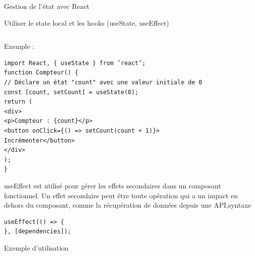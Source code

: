 \documentclass[5pt]{beamer}
\begin{document}
{\begin{frame}[fragile]{ Gestion de l’état avec React}
\begin{block} {Utiliser le state local et les hooks (useState, useEffect)}
\begin{verbatim}
\end{verbatim}
\end{block}
\end{frame}

\begin{frame}[fragile]{ }
\begin{block} {}
Exemple :

\begin{verbatim}
import React, { useState } from ’react’;
function Compteur() {
// Déclare un état "count" avec une valeur initiale de 0
const [count, setCount] = useState(0);
return (
<div>
<p>Compteur : {count}</p>
<button onClick={() => setCount(count + 1)}>
Incrémenter</button>
</div>
);
}
\end{verbatim}

\end{block}
\end{frame}
\begin{frame}[fragile]{}
\begin{block}{}
useEffect est utilisé pour gérer les effets secondaires dans un
composant fonctionnel. Un effet secondaire peut être toute
opération qui a un impact en dehors du composant, comme la
récupération de données depuis une API,syntaxe
\begin{verbatim}
useEffect(() => {
}, [dependencies]);
\end{verbatim}
\end{block}
\end{frame}
\begin{frame}[fragile]{ Exemple d'utilisation}
\begin{block}{ }

\end{block}


\end{frame}}
\end{document}
